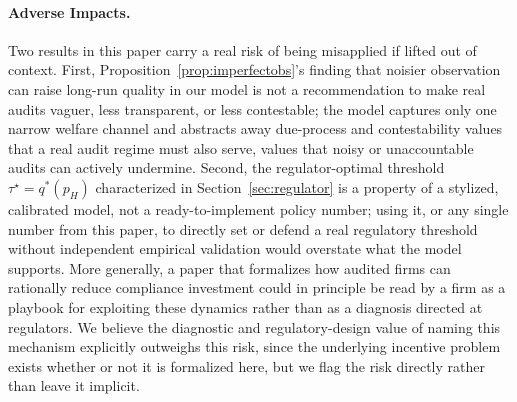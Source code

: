 \paragraph{Adverse Impacts.} Two results in this paper carry a real risk of being misapplied if lifted out of context. First, Proposition~\ref{prop:imperfectobs}'s finding that noisier observation can raise long-run quality in our model is not a recommendation to make real audits vaguer, less transparent, or less contestable; the model captures only one narrow welfare channel and abstracts away due-process and contestability values that a real audit regime must also serve, values that noisy or unaccountable audits can actively undermine. Second, the regulator-optimal threshold $\tau^\star = q^*(p_H)$ characterized in Section~\ref{sec:regulator} is a property of a stylized, calibrated model, not a ready-to-implement policy number; using it, or any single number from this paper, to directly set or defend a real regulatory threshold without independent empirical validation would overstate what the model supports. More generally, a paper that formalizes how audited firms can rationally reduce compliance investment could in principle be read by a firm as a playbook for exploiting these dynamics rather than as a diagnosis directed at regulators. We believe the diagnostic and regulatory-design value of naming this mechanism explicitly outweighs this risk, since the underlying incentive problem exists whether or not it is formalized here, but we flag the risk directly rather than leave it implicit.
